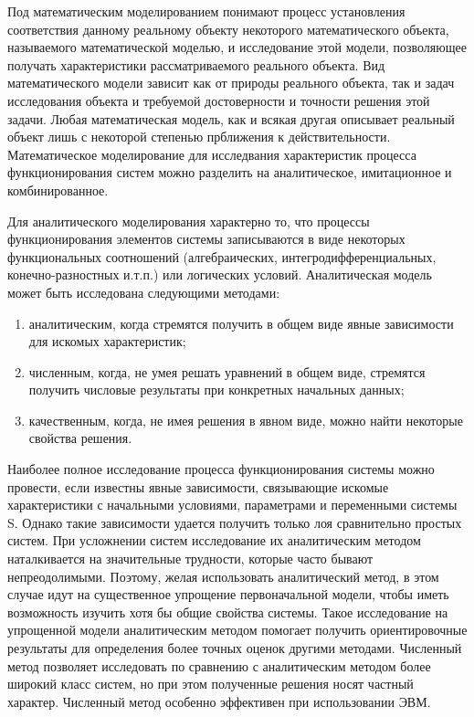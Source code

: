 \documentclass{article}
\begin{document}
    Под математическим моделированием понимают процесс установления соответствия данному реальному объекту некоторого математического объекта, называемого математической моделью, и исследование этой модели, позволяющее получать характеристики рассматриваемого реального объекта. Вид математического модели зависит как от природы реального объекта, так и задач исследования объекта и требуемой достоверности и точности решения этой задачи. Любая математическая модель, как и всякая другая описывает реальный объект лишь с некоторой степенью прближения к действительности. Математическое моделирование для исследвания характеристик процесса функционирования систем можно разделить на аналитическое, имитационное и комбинированное.

    Для аналитического моделирования характерно то, что процессы функционирования элементов системы записываются в виде некоторых функциональных соотношений (алгебраических, интегродифференциальных, конечно-разностных и.т.п.) или логических условий. Аналитическая модель может быть исследована следующими методами:
\begin{enumerate}
  \item аналитическим, когда стремятся получить в общем виде явные зависимости для искомых характеристик;
  \item численным, когда, не умея решать уравнений в общем виде, стремятся получить числовые результаты при конкретных начальных данных;
  \item качественным, когда, не имея решения в явном виде, можно найти некоторые свойства решения.
\end{enumerate}

    Наиболее полное исследование процесса функционирования системы можно провести, если известны явные зависимости, связывающие искомые характеристики с начальными условиями, параметрами и переменными системы S. Однако такие зависимости удается получить только лоя сравнительно простых систем. При усложнении систем исследование их аналитическим методом наталкивается на значительные трудности, которые часто бывают непреодолимыми. Поэтому, желая использовать аналитический метод, в этом случае идут на существенное упрощение первоначальной модели, чтобы иметь возможность изучить хотя бы общие свойства системы. Такое исследование на упрощенной модели аналитическим методом помогает получить ориентировочные результаты для определения более точных оценок другими методами. Численный метод позволяет исследовать по сравнению с аналитическим методом более широкий класс систем, но при этом полученные решения носят частный характер. Численный метод особенно эффективен при использовании ЭВМ.
\end{document}
